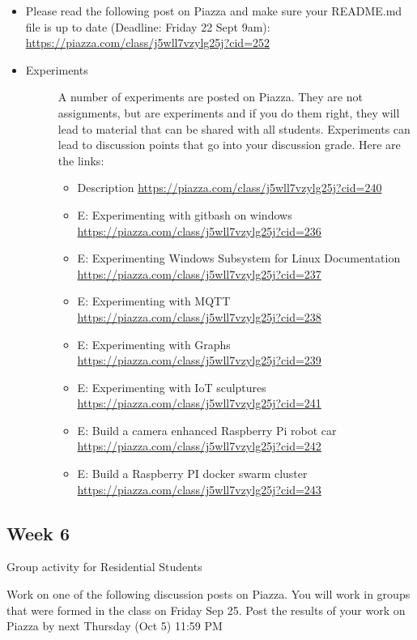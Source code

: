 \begin{itemize}
\item
  Please read the following post on Piazza and make sure your README.md
  file is up to date (Deadline: Friday 22 Sept 9am):
  \url{https://piazza.com/class/j5wll7vzylg25j?cid=252}
\item
  \begin{description}
  \item[Experiments]
  A number of experiments are posted on Piazza. They are not
  assignments, but are experiments and if you do them right, they will
  lead to material that can be shared with all students. Experiments can
  lead to discussion points that go into your discussion grade. Here are
  the links:

  \begin{itemize}
  \tightlist
  \item
    Description \url{https://piazza.com/class/j5wll7vzylg25j?cid=240}
  \item
    E: Experimenting with gitbash on windows
    \url{https://piazza.com/class/j5wll7vzylg25j?cid=236}
  \item
    E: Experimenting Windows Subsystem for Linux Documentation
    \url{https://piazza.com/class/j5wll7vzylg25j?cid=237}
  \item
    E: Experimenting with MQTT
    \url{https://piazza.com/class/j5wll7vzylg25j?cid=238}
  \item
    E: Experimenting with Graphs
    \url{https://piazza.com/class/j5wll7vzylg25j?cid=239}
  \item
    E: Experimenting with IoT sculptures
    \url{https://piazza.com/class/j5wll7vzylg25j?cid=241}
  \item
    E: Build a camera enhanced Raspberry Pi robot car
    \url{https://piazza.com/class/j5wll7vzylg25j?cid=242}
  \item
    E: Build a Raspberry PI docker swarm cluster
    \url{https://piazza.com/class/j5wll7vzylg25j?cid=243}
  \end{itemize}
  \end{description}
\end{itemize}

\subsection{Week 6}\label{week-6}

Group activity for Residential Students

Work on one of the following discussion posts on Piazza. You will work
in groups that were formed in the class on Friday Sep 25. Post the
results of your work on Piazza by next Thursday (Oct 5) 11:59 PM

